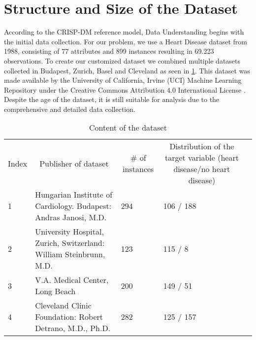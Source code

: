 \section{Structure and Size of the Dataset} \label{sec:dataUnderstanding}


According to the CRISP-DM reference model, Data Understanding begins with the initial data collection. For our problem, we use a Heart Disease dataset from 1988, consisting of 77 attributes and 899 instances resulting in 69.223 observations. To create our customized dataset we combined multiple datasets collected in Budapest, Zurich, Basel and Cleveland as seen in \cref{table:datasets}. This dataset was made available by the University of California, Irvine (UCI) Machine Learning Repository under the Creative Commons Attribution 4.0 International License \citep{janosi1988}. Despite the age of the dataset, it is still suitable for analysis due to the comprehensive and detailed data collection. 

\begin{table}[] 
\begin{tabular}{l|l|l|l|l} 
Index & \multicolumn{1}{c}{Publisher of dataset}                          & \multicolumn{1}{c}{\# of instances} & \multicolumn{1}{c}{Distribution of the target variable (heart disease/no heart disease)} &  \\
1     & Hungarian Institute of Cardiology. Budapest: Andras Janosi, M.D.   & 294                                 & 106 / 188                                                                                &  \\
2     & University Hospital, Zurich, Switzerland: William Steinbrunn, M.D. & 123                                 & 115 / 8                                                                                  &  \\
3     & V.A. Medical Center, Long Beach                                    & 200                                 & 149 / 51                                                                                 &  \\
4     & Cleveland Clinic Foundation: Robert Detrano, M.D., Ph.D.           & 282                                 & 125 / 157                                                                                & 
\end{tabular}
\caption{Content of the dataset} 
\label{table:datasets}
\end{table}

